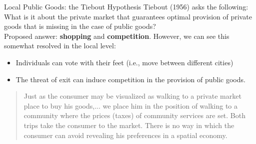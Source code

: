\documentclass[10pt]{extarticle}
\begin{document}
  \begin{problem}{Local Public Goods: the Tiebout Hypothesis}
    Tiebout (1956) asks the following: What is it about the private market that guarantees optimal provision of private goods that is missing in the case of public goods?\\

    Proposed answer: \textbf{shopping} and \textbf{competition}. However, we can see this somewhat resolved in the local level:
    \begin{itemize}
      \item Individuals can vote with their feet (i.e., move between different cities)
      \item The threat of exit can induce competition in the provision of public goods.
    \end{itemize}
    \begin{quote}
        Just as the consumer may be visualized as walking to a private market place to buy his goods,... we place him in the position of walking to a community where the prices (taxes) of community services are set. Both trips take the consumer to the market. There is no way in which the consumer can avoid revealing his preferences in a spatial economy.
    \end{quote}
  \end{problem}
\end{document}
